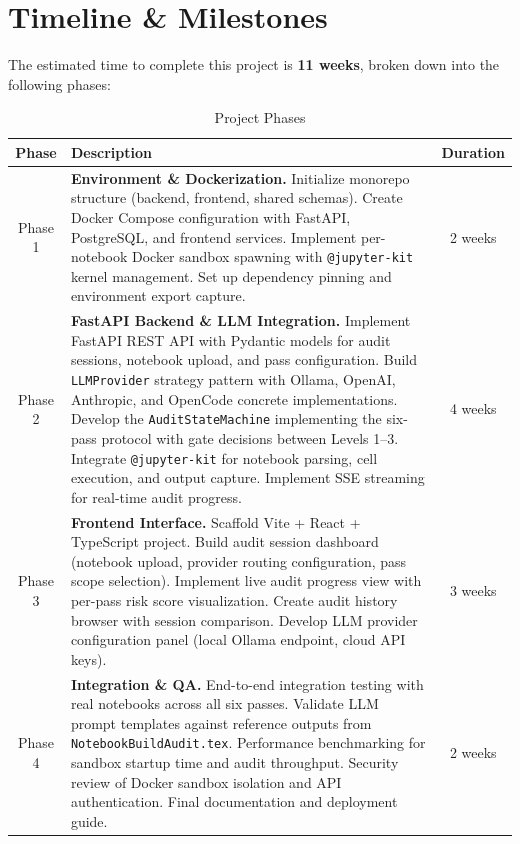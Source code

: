 \documentclass[11pt, a4paper]{article}
\begin{document}
\section{Timeline \& Milestones}

The estimated time to complete this project is \textbf{11 weeks}, broken down into
the following phases:

\begin{table}[H]
  \centering
  \caption{Project Phases}
  \label{tab:phases}
  \renewcommand{\arraystretch}{1.4}
  \begin{tabularx}{\textwidth}{c Y c}
    \toprule
    \textbf{Phase} & \textbf{Description} & \textbf{Duration} \\
    \midrule
    Phase 1 &
    \textbf{Environment \& Dockerization.} Initialize monorepo structure (backend,
    frontend, shared schemas). Create Docker Compose configuration with FastAPI,
    PostgreSQL, and frontend services. Implement per-notebook Docker sandbox
    spawning with \texttt{@jupyter-kit} kernel management. Set up dependency
    pinning and environment export capture. &
    2 weeks \\

    Phase 2 &
    \textbf{FastAPI Backend \& LLM Integration.} Implement FastAPI REST API with
    Pydantic models for audit sessions, notebook upload, and pass configuration.
    Build \texttt{LLMProvider} strategy pattern with Ollama, OpenAI, Anthropic,
    and OpenCode concrete implementations. Develop the \texttt{AuditStateMachine}
    implementing the six-pass protocol with gate decisions between Levels 1--3.
    Integrate \texttt{@jupyter-kit} for notebook parsing, cell execution, and
    output capture. Implement SSE streaming for real-time audit progress. &
    4 weeks \\

    Phase 3 &
    \textbf{Frontend Interface.} Scaffold Vite + React + TypeScript project. Build
    audit session dashboard (notebook upload, provider routing configuration, pass
    scope selection). Implement live audit progress view with per-pass risk score
    visualization. Create audit history browser with session comparison. Develop
    LLM provider configuration panel (local Ollama endpoint, cloud API keys). &
    3 weeks \\

    Phase 4 &
    \textbf{Integration \& QA.} End-to-end integration testing with real notebooks
    across all six passes. Validate LLM prompt templates against reference outputs
    from \texttt{NotebookBuildAudit.tex}. Performance benchmarking for sandbox
    startup time and audit throughput. Security review of Docker sandbox isolation
    and API authentication. Final documentation and deployment guide. &
    2 weeks \\

    \bottomrule
  \end{tabularx}
\end{table}
\end{document}
